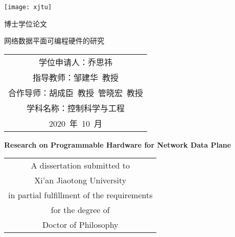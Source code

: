 
\begin{titlepage}
	\begin{center}
		\begin{figure*}[!ht]\vspace{5em}
			\centering
			\texttt{[image: xjtu]}
		\end{figure*}
		
		\vspace{1.5em}
		\begin{center} { 博士学位论文} \end{center}
		
		\vspace{8.5em}
		\begin{center} {\sanhao\boldsong 网络数据平面可编程硬件的研究}\end{center}
		
		\vspace{15em}
		{\sanhao
			\begin{center} \renewcommand{\arraystretch}{1.5}
				\begin{tabular}{c}
					学位申请人：乔思祎 \\
					指导教师：邹建华~教授 \\
					合作导师：胡成臣~教授~管晓宏~教授\\
					学科名称：控制科学与工程 \\
					2020~年~10~月 \\
				\end{tabular} \renewcommand{\arraystretch}{1}
			\end{center} 
		}
	\end{center}
	\clearpage{\pagestyle{empty}\cleardoublepage}
	
	\newpage\thispagestyle{empty}
	\begin{center}
		\parbox[t][0.7cm][t]{\textwidth}{}
		
		\begin{center}{\sanhao\bfseries Research on Programmable Hardware for Network Data Plane}\end{center}
		
		\vspace{4.7cm}
		{\sanhao
			\begin{center} \renewcommand{\arraystretch}{1.4}
				\begin{tabular}{c}
					A dissertation submitted to  \\
					Xi'an Jiaotong University \\
					in partial fulfillment of the requirements \\
					for the degree of \\
					Doctor of Philosophy \\
				\end{tabular} \renewcommand{\arraystretch}{1}
			\end{center} 
		}
		

\end{center}
\end{titlepage}
